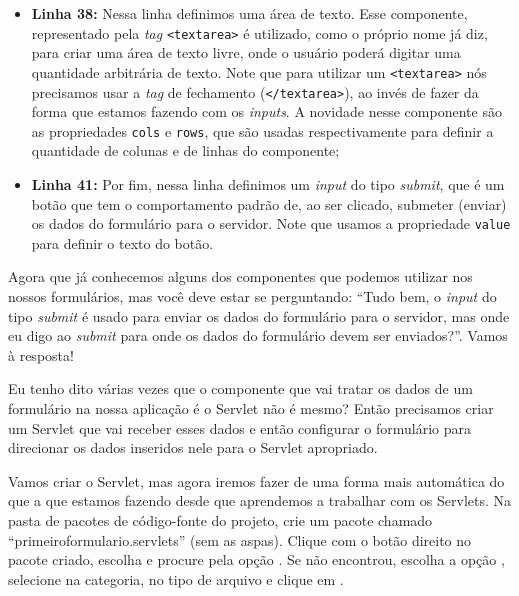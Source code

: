 \begin{itemize}
    \item \textbf{Linha 38:} Nessa linha definimos uma área de texto. Esse componente, representado pela \textit{tag} \texttt{<textarea>} é utilizado, como o próprio nome já diz, para criar uma área de texto livre, onde o usuário poderá digitar uma quantidade arbitrária de texto. Note que para utilizar um \texttt{<textarea>} nós precisamos usar a \textit{tag} de fechamento (\texttt{</textarea>}), ao invés de fazer da forma que estamos fazendo com os \textit{inputs}. A novidade nesse componente são as propriedades \texttt{cols} e \texttt{rows}, que são usadas respectivamente para definir a quantidade de colunas e de linhas do componente;
    
    \item \textbf{Linha 41:} Por fim, nessa linha definimos um \textit{input} do tipo \textit{submit}, que é um botão que tem o comportamento padrão de, ao ser clicado, submeter (enviar) os dados do formulário para o servidor. Note que usamos a propriedade \texttt{value} para definir o texto do botão.
\end{itemize}

Agora que já conhecemos alguns dos componentes que podemos utilizar nos nossos formulários, mas você deve estar se perguntando: ``Tudo bem, o \textit{input} do tipo \textit{submit} é usado para enviar os dados do formulário para o servidor, mas onde eu digo ao \textit{submit} para onde os dados do formulário devem ser enviados?''. Vamos à resposta!

Eu tenho dito várias vezes que o componente que vai tratar os dados de um formulário na nossa aplicação é o Servlet não é mesmo? Então precisamos criar um Servlet que vai receber esses dados e então configurar o formulário para direcionar os dados inseridos nele para o Servlet apropriado.

Vamos criar o Servlet, mas agora iremos fazer de uma forma mais automática do que a que estamos fazendo desde que aprendemos a trabalhar com os Servlets. Na pasta de pacotes de código-fonte do projeto, crie um pacote chamado ``primeiroformulario.servlets'' (sem as aspas). Clique com o botão direito no pacote criado, escolha  e procure pela opção . Se não encontrou, escolha a opção , selecione  na categoria,  no tipo de arquivo e clique em .

